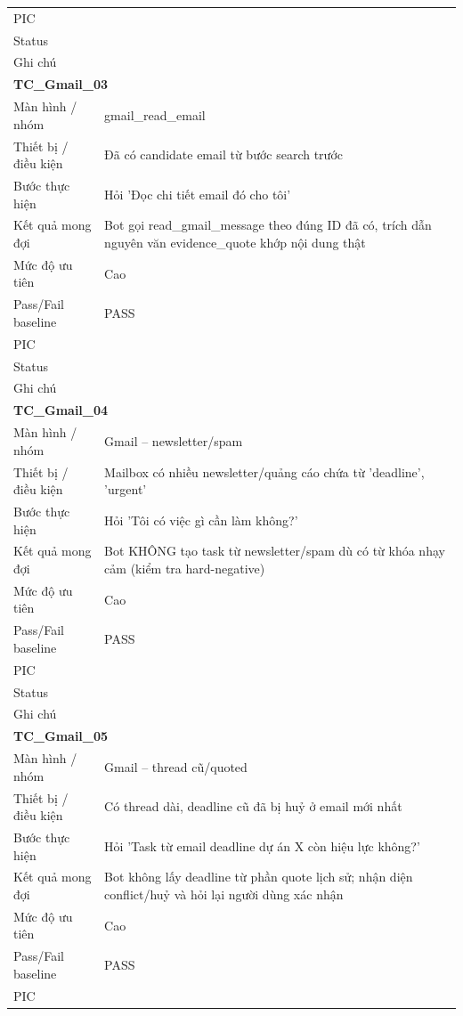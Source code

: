 \documentclass[12pt,a4paper]{article}
\begin{document}
\begin{longtable}{p{3.0cm}p{11.5cm}}
PIC &  \\
Status &  \\
Ghi chú &  \\
\midrule
\multicolumn{2}{l}{\textbf{TC\_Gmail\_03}} \\
Màn hình / nhóm & gmail\_read\_email \\
Thiết bị / điều kiện & Đã có candidate email từ bước search trước \\
Bước thực hiện & Hỏi 'Đọc chi tiết email đó cho tôi' \\
Kết quả mong đợi & Bot gọi read\_gmail\_message theo đúng ID đã có, trích dẫn nguyên văn evidence\_quote khớp nội dung thật \\
Mức độ ưu tiên & Cao \\
Pass/Fail baseline & PASS \\
PIC &  \\
Status &  \\
Ghi chú &  \\
\midrule
\multicolumn{2}{l}{\textbf{TC\_Gmail\_04}} \\
Màn hình / nhóm & Gmail – newsletter/spam \\
Thiết bị / điều kiện & Mailbox có nhiều newsletter/quảng cáo chứa từ 'deadline', 'urgent' \\
Bước thực hiện & Hỏi 'Tôi có việc gì cần làm không?' \\
Kết quả mong đợi & Bot KHÔNG tạo task từ newsletter/spam dù có từ khóa nhạy cảm (kiểm tra hard-negative) \\
Mức độ ưu tiên & Cao \\
Pass/Fail baseline & PASS \\
PIC &  \\
Status &  \\
Ghi chú &  \\
\midrule
\multicolumn{2}{l}{\textbf{TC\_Gmail\_05}} \\
Màn hình / nhóm & Gmail – thread cũ/quoted \\
Thiết bị / điều kiện & Có thread dài, deadline cũ đã bị huỷ ở email mới nhất \\
Bước thực hiện & Hỏi 'Task từ email deadline dự án X còn hiệu lực không?' \\
Kết quả mong đợi & Bot không lấy deadline từ phần quote lịch sử; nhận diện conflict/huỷ và hỏi lại người dùng xác nhận \\
Mức độ ưu tiên & Cao \\
Pass/Fail baseline & PASS \\
PIC &  \\

\end{longtable}
\end{document}
